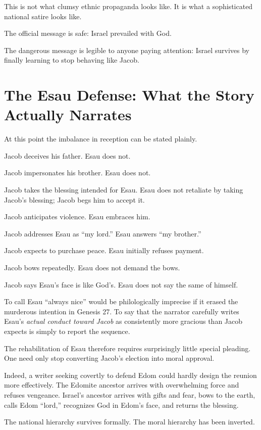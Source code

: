 This is not what clumsy ethnic propaganda looks like. It is what a sophisticated national satire looks like.

The official message is safe: Israel prevailed with God.

The dangerous message is legible to anyone paying attention: Israel survives by finally learning to stop behaving like Jacob.

\section{The Esau Defense: What the Story Actually Narrates}

At this point the imbalance in reception can be stated plainly.

Jacob deceives his father. Esau does not.

Jacob impersonates his brother. Esau does not.

Jacob takes the blessing intended for Esau. Esau does not retaliate by taking Jacob's blessing; Jacob begs him to accept it.

Jacob anticipates violence. Esau embraces him.

Jacob addresses Esau as ``my lord.'' Esau answers ``my brother.''

Jacob expects to purchase peace. Esau initially refuses payment.

Jacob bows repeatedly. Esau does not demand the bows.

Jacob says Esau's face is like God's. Esau does not say the same of himself.

To call Esau ``always nice'' would be philologically imprecise if it erased the murderous intention in Genesis 27. To say that the narrator carefully writes Esau's \emph{actual conduct toward Jacob} as consistently more gracious than Jacob expects is simply to report the sequence.

The rehabilitation of Esau therefore requires surprisingly little special pleading. One need only stop converting Jacob's election into moral approval.

Indeed, a writer seeking covertly to defend Edom could hardly design the reunion more effectively. The Edomite ancestor arrives with overwhelming force and refuses vengeance. Israel's ancestor arrives with gifts and fear, bows to the earth, calls Edom ``lord,'' recognizes God in Edom's face, and returns the blessing.

The national hierarchy survives formally. The moral hierarchy has been inverted.

